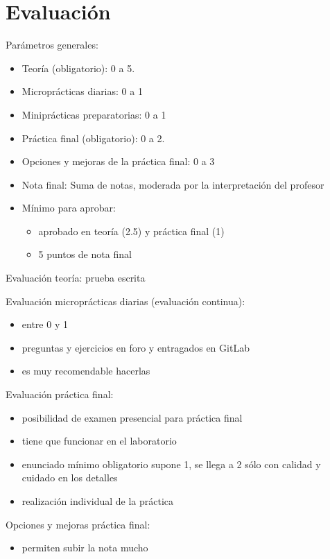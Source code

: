 \documentclass[a4paper,12pt]{article}
\begin{document}
\section{Evaluación}

Parámetros generales:

\begin{itemize}
\item Teoría (obligatorio): 0 a 5.
\item Microprácticas diarias: 0 a 1
\item Miniprácticas preparatorias: 0 a 1
\item Práctica final (obligatorio): 0 a 2.
\item Opciones y mejoras de la práctica final: 0 a 3
\item Nota final: Suma de notas, moderada por la interpretación del profesor
\item Mínimo para aprobar:
      \begin{itemize}
      \item aprobado en teoría (2.5) y práctica final (1)
      \item 5 puntos de nota final
      \end{itemize}
\end{itemize}

Evaluación teoría: prueba escrita

Evaluación microprácticas diarias (evaluación continua):

\begin{itemize}
\item entre 0 y 1
\item preguntas y ejercicios en foro y entragados en GitLab
\item es muy recomendable hacerlas
\end{itemize}

Evaluación práctica final:

\begin{itemize}
\item posibilidad de examen presencial para práctica final
\item tiene que funcionar en el laboratorio
\item enunciado mínimo obligatorio supone 1, se llega a 2 sólo con calidad y cuidado en los detalles
\item realización individual de la práctica
\end{itemize}

Opciones y mejoras práctica final:

\begin{itemize}
\item permiten subir la nota mucho
\end{itemize}
\end{document}
